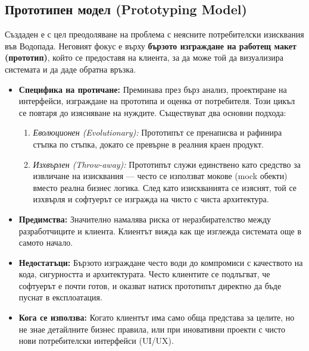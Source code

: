 \documentclass{scrartcl}
\begin{document}
\begin{FlushLeft}
\subsection{Прототипен модел (Prototyping Model)}
Създаден е с цел преодоляване на проблема с неясните потребителски изисквания във Водопада. Неговият фокус е върху \textbf{бързото изграждане на работещ макет (прототип)}, който се предоставя на клиента, за да може той да визуализира системата и да даде обратна връзка.
\begin{itemize}
    \item \textbf{Специфика на протичане:} Преминава през бърз анализ, проектиране на интерфейси, изграждане на прототипа и оценка от потребителя. Този цикъл се повтаря до изясняване на нуждите. Съществуват два основни подхода:
    \begin{enumerate}
        \item \emph{Еволюционен (Evolutionary):} Прототипът се пренаписва и рафинира стъпка по стъпка, докато се превърне в реалния краен продукт.
        \item \emph{Изхвърлен (Throw-away):} Прототипът служи единствено като средство за извличане на изисквания — често се използват мокове (mock обекти) вместо реална бизнес логика. След като изискванията се изяснят, той се изхвърля и софтуерът се изгражда на чисто с чиста архитектура.
    \end{enumerate}
    \item \textbf{Предимства:} Значително намалява риска от неразбирателство между разработчиците и клиента. Клиентът вижда как ще изглежда системата още в самото начало.
    \item \textbf{Недостатъци:} Бързото изграждане често води до компромиси с качеството на кода, сигурността и архитектурата. Често клиентите се подлъгват, че софтуерът е почти готов, и оказват натиск прототипът директно да бъде пуснат в експлоатация.
    \item \textbf{Кога се използва:} Когато клиентът има само обща представа за целите, но не знае детайлните бизнес правила, или при иновативни проекти с чисто нови потребителски интерфейси (UI/UX).
\end{itemize}


\end{FlushLeft}
\end{document}
